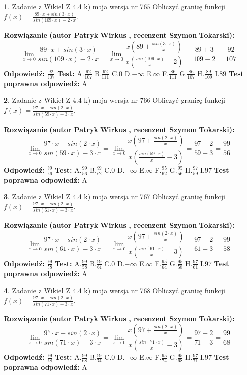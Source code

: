 \documentclass[12pt, a4paper]{article}
\theoremstyle{definition} %
\newtheorem{zad}{}
\newcommand{\zadStart}[1]{\begin{zad}#1\newline}
\newcommand{\zadStop}{\end{zad}}
\newcommand{\rozwStart}[2]{\noindent \textbf{Rozwiązanie (autor #1 , recenzent #2): }\newline}
\newcommand{\rozwStop}{\newline}
\newcommand{\odpStart}{\noindent \textbf{Odpowiedź:}\newline}
\newcommand{\odpStop}{\newline}
\newcommand{\testStart}{\noindent \textbf{Test:}\newline}
\newcommand{\testStop}{\newline}
\newcommand{\kluczStart}{\noindent \textbf{Test poprawna odpowiedź:}\newline}
\newcommand{\kluczStop}{\newline}
\begin{document}
\zadStart{Zadanie z Wikieł Z 4.4 k) moja wersja nr 765}
Obliczyć granicę funkcji $f(x)=\frac{89\cdot x +sin(3\cdot x)}{sin(109\cdot x) -2\cdot x}$.
\zadStop
\rozwStart{Patryk Wirkus}{Szymon Tokarski}
$$\lim\limits_{x\to 0}\frac{89\cdot x +sin(3\cdot x)}{sin(109\cdot x) -2\cdot x}
=\lim\limits_{x\to 0}\frac{x(89+\frac{sin(3\cdot x)}{x})}{x(\frac{sin(109\cdot x)}{x}-2)}
=\frac{89+3}{109-2} = \frac{92}{107}$$
\rozwStop
\odpStart
$\frac{92}{107}$
\odpStop
\testStart
A.$\frac{92}{107}$
B.$\frac{92}{111}$
C.$0$
D.$-\infty$
E.$\infty$
F.$\frac{86}{111}$
G.$\frac{86}{107}$
H.$\frac{89}{109}$
I.$89$
\testStop
\kluczStart
A
\kluczStop



\zadStart{Zadanie z Wikieł Z 4.4 k) moja wersja nr 766}
Obliczyć granicę funkcji $f(x)=\frac{97\cdot x +sin(2\cdot x)}{sin(59\cdot x) -3\cdot x}$.
\zadStop
\rozwStart{Patryk Wirkus}{Szymon Tokarski}
$$\lim\limits_{x\to 0}\frac{97\cdot x +sin(2\cdot x)}{sin(59\cdot x) -3\cdot x}
=\lim\limits_{x\to 0}\frac{x(97+\frac{sin(2\cdot x)}{x})}{x(\frac{sin(59\cdot x)}{x}-3)}
=\frac{97+2}{59-3} = \frac{99}{56}$$
\rozwStop
\odpStart
$\frac{99}{56}$
\odpStop
\testStart
A.$\frac{99}{56}$
B.$\frac{99}{62}$
C.$0$
D.$-\infty$
E.$\infty$
F.$\frac{95}{62}$
G.$\frac{95}{56}$
H.$\frac{97}{59}$
I.$97$
\testStop
\kluczStart
A
\kluczStop



\zadStart{Zadanie z Wikieł Z 4.4 k) moja wersja nr 767}
Obliczyć granicę funkcji $f(x)=\frac{97\cdot x +sin(2\cdot x)}{sin(61\cdot x) -3\cdot x}$.
\zadStop
\rozwStart{Patryk Wirkus}{Szymon Tokarski}
$$\lim\limits_{x\to 0}\frac{97\cdot x +sin(2\cdot x)}{sin(61\cdot x) -3\cdot x}
=\lim\limits_{x\to 0}\frac{x(97+\frac{sin(2\cdot x)}{x})}{x(\frac{sin(61\cdot x)}{x}-3)}
=\frac{97+2}{61-3} = \frac{99}{58}$$
\rozwStop
\odpStart
$\frac{99}{58}$
\odpStop
\testStart
A.$\frac{99}{58}$
B.$\frac{99}{64}$
C.$0$
D.$-\infty$
E.$\infty$
F.$\frac{95}{64}$
G.$\frac{95}{58}$
H.$\frac{97}{61}$
I.$97$
\testStop
\kluczStart
A
\kluczStop



\zadStart{Zadanie z Wikieł Z 4.4 k) moja wersja nr 768}
Obliczyć granicę funkcji $f(x)=\frac{97\cdot x +sin(2\cdot x)}{sin(71\cdot x) -3\cdot x}$.
\zadStop
\rozwStart{Patryk Wirkus}{Szymon Tokarski}
$$\lim\limits_{x\to 0}\frac{97\cdot x +sin(2\cdot x)}{sin(71\cdot x) -3\cdot x}
=\lim\limits_{x\to 0}\frac{x(97+\frac{sin(2\cdot x)}{x})}{x(\frac{sin(71\cdot x)}{x}-3)}
=\frac{97+2}{71-3} = \frac{99}{68}$$
\rozwStop
\odpStart
$\frac{99}{68}$
\odpStop
\testStart
A.$\frac{99}{68}$
B.$\frac{99}{74}$
C.$0$
D.$-\infty$
E.$\infty$
F.$\frac{95}{74}$
G.$\frac{95}{68}$
H.$\frac{97}{71}$
I.$97$
\testStop
\kluczStart
A
\kluczStop
\end{document}

